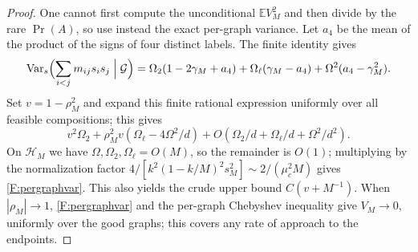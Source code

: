\documentclass[a4paper,11pt]{article}
\numberwithin{equation}{section}
\newcommand{\E}{\mathbb E}
\newcommand{\Var}{\operatorname{Var}}
\begin{document}
\begin{proof}
One cannot first compute the unconditional $\E V_M^2$ and then divide by the rare $\Pr(A)$, so use instead the
exact per-graph variance. Let $a_4$ be the mean of the product of the signs of four distinct labels. The
finite identity gives
\[
\Var_s\Bigl(\sum_{i<j}m_{ij}s_is_j\Bigm|\mathcal G\Bigr)=\Omega_2(1-2\gamma_M+a_4)+\Omega_\ell(\gamma_M-a_4)+\Omega^2(a_4-\gamma_M^2).
\]
Set $v=1-\rho_M^2$ and expand this finite rational expression uniformly over all feasible compositions; this
gives
\[
v^2\Omega_2+\rho_M^2v(\Omega_\ell-4\Omega^2/d)+O(\Omega_2/d+\Omega_\ell/d+\Omega^2/d^2).
\]
On $\mathcal H_M$ we have $\Omega,\Omega_2,\Omega_\ell=O(M)$, so the remainder is $O(1)$; multiplying by the
normalization factor $4/[k^2(1-k/M)^2s_M^2]\sim2/(\mu_c^2M)$ gives \eqref{F:pergraphvar}. This also yields the
crude upper bound $C(v+M^{-1})$. When $|\rho_M|\to1$, \eqref{F:pergraphvar} and the per-graph Chebyshev
inequality give $V_M\to0$, uniformly over the good graphs; this covers any rate of approach to the endpoints.
\end{proof}
\end{document}
